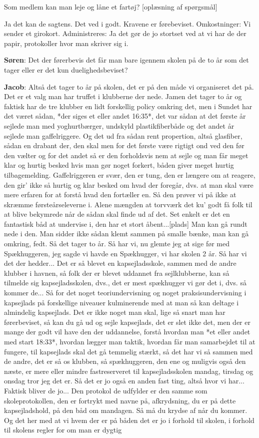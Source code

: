Som medlem kan man leje og låne et fartøj? [oplæsning af spørgsmål]

Ja det kan de sagtens. Det ved i godt. Kravene er førebeviset. Omkostninger: Vi sender et girokort. Administreres: Ja det gør de jo stortset ved at vi har de der papir, protokoller hvor man skriver sig i. 

\textbf{Søren}: Det der førerbevis det får man bare igennem skolen på de to år som det tager eller er det kun duelighedsbeviset?

\textbf{Jacob}: Altså det tager to år på skolen, det er på den måde vi organiseret det på. Det er et valg man har truffet i klubberne der nede. Jamen det tager to år og faktisk har de tre klubber en lidt forskellig policy omkring det, men i Sundet har det været sådan, *der siges et eller andet 16:35*, det var sådan at det første år sejlede man med yoghurtbærger, undskyld plastikfiberbåde og det andet år sejlede man gaffelriggere. Og det ud fra sådan rent propertion, altså glasfiber, sådan en drabant der, den skal men for det første være rigtigt ond ved den før den vælter og for det andet så er den forholdsvis nem at sejle og man får meget klar og hurtig besked hvis man gør noget forkert, båden giver meget hurtig tilbagemelding. Gaffelriggeren er  svær, den er tung, den er længere om at reagere, den gir' ikke så hurtig og klar besked om hvad der foregår, dvs. at man skal være mere erfaren for at forstå hvad den fortæller en. Så den prøver vi på ikke at skræmme førsteårseleverne i. Alene mængden at torvværk det ku' godt få folk til at blive bekymrede når de sådan skal finde ud af det. Set enkelt er det en fantastisk båd at undervise i, den har et stort åbent...[plads] Man kan gå rundt nede i den. Man sidder ikke sådan klemt sammen på smalle bænke, man kan gå omkring, fedt. Så det tager to år. Så har vi, nu glemte jeg at sige før med Spækhuggeren, jeg sagde vi havde en Spækhugger, vi har skolen 2 år. Så har vi det der hedder... Det er så blevet en kapsejladsskole, sammen med de andre klubber i havnen, så folk der er blevet uddannet fra sejlklubberne, kan så tilmelde sig kapsejladsskolen, dvs., det er mest spækhugger vi gør det i, dvs. så kommer de... Så for det noget teoriundervisning og noget praksisundervisning i kapsejlads på forskellige niveauer kulminerende med at man så kan deltage i almindelig kapsejlads. Det er ikke noget man skal, lige så snart man har førerbeviset, så kan du gå ud og sejle kapsejlads, det er slet ikke det, men der er mange der godt vil have den der uddannelse, forstå hvordan man *et eller andet med start 18:33*, hvordan lægger man taktik, hvordan får man samarbejdet til at fungere, til kapsejlads skal det gå temmelig stærkt, så det har vi så sammen med de andre, det er så os klubben, så spækhuggeren, den ene og muligvis også den næste, er mere eller mindre fastreserveret til kapsejladsskolen mandag, tirsdag og onsdag tror jeg det er. Så det er jo også en anden fast ting, altså hvor vi har... Faktisk bliver de jo... Den protokol de udfylder er den samme som skoleprotokollen, den er fortrykt med navne på, afkrydsning, du er på dette kapsejladshold, på den båd om mandagen. Så må du krydse af når du kommer. Og det her med at vi hvem der er på båden det er jo i forhold til skolen, i forhold til skolens regler for om man er dygtig 